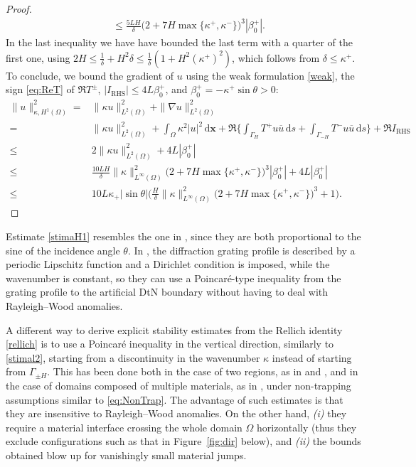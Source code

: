 \documentclass[a4paper,10pt]{article}
\newcommand{\bx}{{\mathbf x}}
\newcommand{\rd}{{\,\mathrm d}}
\newcommand{\cu}{{\overline{u}}}
\newcommand{\GH}{{\Gamma_H}}
\newcommand{\GmH}{{\Gamma_{-H}}}
\newcommand{\GpmH}{{\Gamma_{\pm H}}}
\begin{document}
\begin{proof}
\begin{align*}
	&\le \frac{5LH}\delta\big(2+7H\max\{\kappa^+,\kappa^-\}\big)^3|\beta_0^+|.
\end{align*}
In the last inequality we have have bounded the last term with a quarter of the first one, using $2H\le\frac1\delta+H^2\delta\le\frac1\delta(1+H^2(\kappa^+)^2)$, which follows from $\delta\le\kappa^+$.
To conclude, we bound the gradient of $u$ using the weak formulation \eqref{weak}, the sign \eqref{eq:ReT} of $\Re T^\pm$, $|I_{\mathrm{RHS}}|\le 4L\beta_0^+$, and $\beta_0^+=-\kappa^+\sin\theta>0$:
\begin{align*} 
	\|u\|_{\kappa, H^1(\Omega)}^2 = 
	&\|\kappa u\|_{L^2(\Omega)}^2 + \|\nabla u\|_{L^2(\Omega)}^2
	\\ 
	=&\|\kappa u\|_{L^2(\Omega)}^2 +
	\int_\Omega \kappa^2 |u|^2\rd\bx+
	\Re\Big\{\int_\GH T^+u\cu\rd s+\int_\GmH T^-u\cu\rd s\Big\}+\Re I_{\mathrm{RHS}}
	\\ 
	\le& 2 \|\kappa u\|_{L^2(\Omega)}^2 +4L|\beta_0^+|
	\\ 
	\le& \frac{10LH}\delta\|\kappa\|_{L^\infty(\Omega)}^2 \big(2+7H\max\{\kappa^+,\kappa^-\}\big)^3|\beta_0^+|
	+4L|\beta_0^+|
	\\ 
	\le& 10L\kappa_+|\sin\theta|\bigg(\frac H\delta\|\kappa\|_{L^\infty(\Omega)}^2
	\big(2+7H\max\{\kappa^+,\kappa^-\}\big)^3+1\bigg).
\end{align*}
\end{proof}

\begin{rem}
\label{rem:StabilityCompare}
Estimate \eqref{stimaH1} resembles the one in \cite[Theorem.~3.1]{Zhu2024}, since they {are both proportional to the sine of the incidence} 
angle $\theta$. 
In \cite{Zhu2024}, the diffraction grating profile is described by a periodic Lipschitz function and a Dirichlet condition is imposed, while the wavenumber is constant, so they can use a Poincaré-type inequality from the grating profile to the artificial DtN boundary without having to deal with Rayleigh--Wood anomalies. 

A different way to derive explicit stability estimates from the Rellich identity \eqref{rellich} is to use a Poincaré inequality in the vertical direction, similarly to \eqref{stimal2}, starting from a discontinuity in the wavenumber $\kappa$ instead of starting from $\GpmH$.
This has been done both in the case of two regions, as in \cite[\S4, in particular pp.~380--381]{Lechleiter2010} and \cite[\S5]{Zhu2024}, and in the case of domains composed of multiple materials, as in \cite[Lemma~2]{Civiletti2020}, under non-trapping assumptions similar to \eqref{eq:NonTrap}. 
The advantage of such estimates is that they are insensitive to Rayleigh--Wood anomalies.
On the other hand, \emph{(i)} they require a material interface crossing the whole domain $\Omega$ horizontally (thus they exclude configurations such as that in Figure~\ref{fig:dir} 
below), and \emph{(ii)} the bounds obtained blow up for vanishingly small material jumps.
\end{rem}
\end{document}
